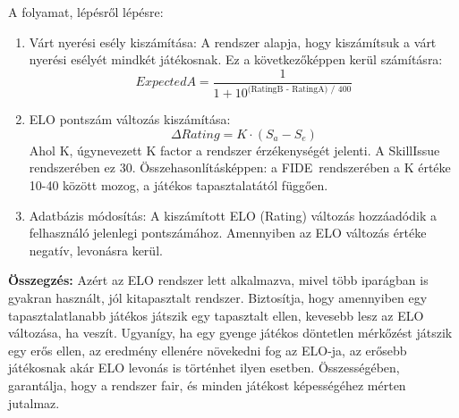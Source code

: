 A folyamat, lépésről lépésre:
\begin{enumerate}
    \item Várt nyerési esély kiszámítása: A rendszer alapja, hogy kiszámítsuk a várt nyerési esélyét mindkét játékosnak. Ez a következőképpen kerül számításra:
    \begin{equation}
        ExpectedA = \frac{1}{1 + 10^\text{(RatingB - RatingA) / 400}}
    \end{equation}
    
    \item ELO pontszám változás kiszámítása: \begin{equation}
            \Delta Rating = K \cdot (S_a - S_e)
    \end{equation}
    Ahol K, úgynevezett K factor a rendszer érzékenységét jelenti. A SkillIssue rendszerében ez 30. Összehasonlításképpen: a FIDE\footnotemark\ rendszerében a K értéke 10-40 között mozog, a játékos tapasztalatától függően.

    \item Adatbázis módosítás: A kiszámított ELO (Rating) változás hozzáadódik a felhasználó jelenlegi pontszámához. Amennyiben az ELO változás értéke negatív, levonásra kerül.
\end{enumerate}


\textbf{Összegzés:} Azért az ELO rendszer lett alkalmazva, mivel több iparágban is gyakran használt, jól kitapasztalt rendszer. Biztosítja, hogy amennyiben egy tapasztalatlanabb játékos játszik egy tapasztalt ellen, kevesebb lesz az ELO változása, ha veszít. Ugyanígy, ha egy gyenge játékos döntetlen mérkőzést játszik egy erős ellen, az eredmény ellenére növekedni fog az ELO-ja, az erősebb játékosnak akár ELO levonás is történhet ilyen esetben. Összességében, garantálja, hogy a rendszer fair, és minden játékost képességéhez mérten jutalmaz. 
